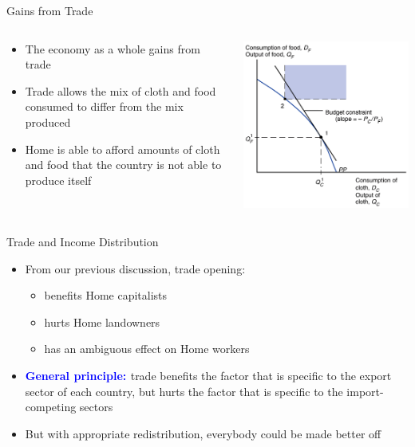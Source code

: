 \documentclass[10pt,hyperref={CJKbookmarks=true},xcolor=dvipsnames,aspectratio=169]{beamer}
\begin{document}
\begin{frame}{Gains from Trade }


\begin{columns}[onlytextwidth]
\begin{column}{0.4\textwidth}
\begin{itemize}
\item The economy as a whole gains from trade 
\item Trade allows the mix of cloth and food consumed to differ from the
mix produced 
\item Home is able to afford amounts of cloth and food that the country
is not able to produce itself 
\end{itemize}

\end{column}
\begin{column}{0.6\textwidth}
\centering \includegraphics[width=0.6\columnwidth]{fig/sfm/lec4-22}
\end{column}
\end{columns}

\end{frame}

\begin{frame}{Trade and Income Distribution}

\begin{itemize}
\item From our previous discussion, trade opening: 

\begin{itemize}
\item benefits Home capitalists 
\item hurts Home landowners
\item has an ambiguous effect on Home workers 
\end{itemize}
\item \textbf{\textcolor{blue}{General principle: }}trade benefits the factor
that is specific to the export sector of each country, but hurts the
factor that is specific to the import-competing sectors 
\item But with appropriate redistribution, everybody could be made better
off
\end{itemize}
\end{frame}
\end{document}
